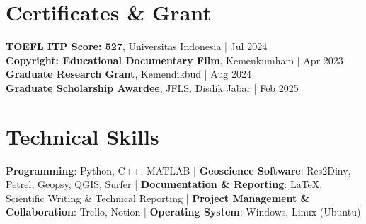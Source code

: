\documentclass[10.5pt,a4paper]{article}
\begin{document}
\section*{Certificates \& Grant}

\textbf{TOEFL ITP Score: 527}, Universitas Indonesia \quad | \quad Jul 2024 \\
\textbf{Copyright: Educational Documentary Film}, Kemenkumham \quad | \quad Apr 2023\\
\textbf{Graduate Research Grant}, Kemendikbud \quad | \quad Aug 2024 \\
\textbf{Graduate Scholarship Awardee}, JFLS, Disdik Jabar \quad | \quad Feb 2025

\section*{Technical Skills}

\textbf{Programming}: Python, C++, MATLAB  \quad | \quad
\textbf{Geoscience Software}: Res2Dinv, Petrel, Geopsy, QGIS, Surfer  \quad | \quad
\textbf{Documentation \& Reporting}: LaTeX, Scientific Writing \& Technical Reporting  \quad | \quad
\textbf{Project Management \& Collaboration}: Trello, Notion  \quad | \quad
\textbf{Operating System}: Windows, Linux (Ubuntu)
\end{document}
